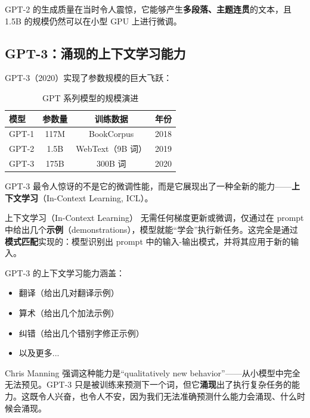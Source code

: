 \documentclass[a4paper]{article}
\begin{document}
GPT-2 的生成质量在当时令人震惊，它能够产生\textbf{多段落、主题连贯}的文本，且 1.5B 的规模仍然可以在小型 GPU 上进行微调。

\subsection{GPT-3：涌现的上下文学习能力}

GPT-3（2020）实现了参数规模的巨大飞跃：

\begin{table}[H]
\centering
\begin{tabular}{lccc}
\toprule
\textbf{模型} & \textbf{参数量} & \textbf{训练数据} & \textbf{年份} \\
\midrule
GPT-1 & 117M & BookCorpus & 2018 \\
GPT-2 & 1.5B & WebText（9B 词） & 2019 \\
GPT-3 & 175B & 300B 词 & 2020 \\
\bottomrule
\end{tabular}
\caption{GPT 系列模型的规模演进}
\end{table}

GPT-3 最令人惊讶的不是它的微调性能，而是它展现出了一种全新的能力——\textbf{上下文学习}（In-Context Learning, ICL）。




\begin{importantbox}{上下文学习（In-Context Learning）}
无需任何梯度更新或微调，仅通过在 prompt 中给出几个\textbf{示例}（demonstrations），模型就能``学会''执行新任务。这完全是通过\textbf{模式匹配}实现的：模型识别出 prompt 中的输入-输出模式，并将其应用于新的输入。

GPT-3 的上下文学习能力涵盖：
\begin{itemize}
    \item 翻译（给出几对翻译示例）
    \item 算术（给出几个加法示例）
    \item 纠错（给出几个错别字修正示例）
    \item 以及更多...
\end{itemize}
\end{importantbox}





Chris Manning 强调这种能力是``qualitatively new behavior''——从小模型中完全无法预见。GPT-3 只是被训练来预测下一个词，但它\textbf{涌现}出了执行复杂任务的能力。这既令人兴奋，也令人不安，因为我们无法准确预测什么能力会涌现、什么时候会涌现。
\end{document}
